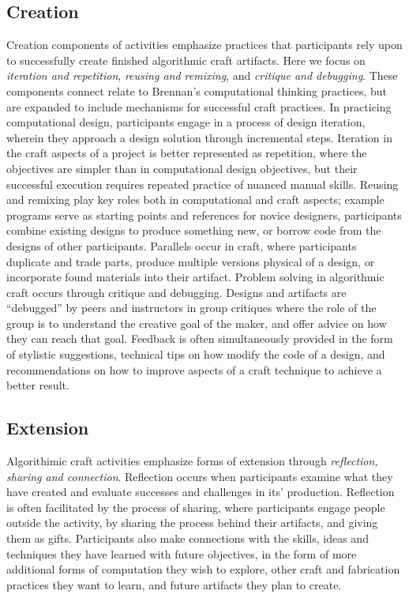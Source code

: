 \documentclass{sigchi}
\begin{document}
\subsection{Creation}
Creation components of activities emphasize practices that participants rely upon to successfully create finished algorithmic craft artifacts. Here we focus on \emph{iteration and repetition}, \emph{reusing and remixing}, and \emph{critique and debugging}. These components connect relate to Brennan's computational thinking practices, but are expanded to include mechanisms for successful craft practices. In practicing computational design, participants engage in a process of design iteration, wherein they approach a design solution through incremental steps. Iteration in the craft aspects of a project is better represented as repetition, where the objectives are simpler than in computational design objectives, but their successful execution requires repeated practice of nuanced manual skills. Reusing and remixing play key roles both in computational and craft aspects; example programs serve as starting points and references for novice designers, participants combine existing designs to produce something new, or borrow code from the designs of other participants. Parallels occur in craft, where participants duplicate and trade parts, produce multiple versions physical of a design, or incorporate found materials into their artifact. Problem solving in algorithmic craft occurs through critique and debugging. Designs and artifacts are ``debugged'' by peers and instructors in group critiques where the role of the group is to understand the creative goal of the maker, and offer advice on how they can reach that goal. Feedback is often simultaneously provided in the form of stylistic suggestions, technical tips on how modify the code of a design, and recommendations on how to improve aspects of a craft technique to achieve a better result.

\subsection{Extension}
Algorithimic craft activities emphasize forms of extension through \emph{reflection, sharing and connection}. Reflection occurs when participants examine what they have created and evaluate successes and challenges in its' production. Reflection is often facilitated by the process of sharing, where participants engage people outside the activity, by sharing the process behind their artifacts, and giving them as gifts. Participants also make connections with the skills, ideas and techniques they have learned with future objectives, in the form of more additional forms of computation they wish to explore, other craft and fabrication practices they want to learn, and future artifacts they plan to create. 
\end{document}

